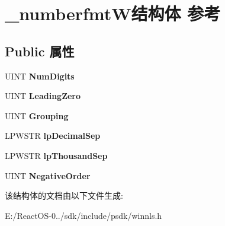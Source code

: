 \hypertarget{struct__numberfmt_w}{}\section{\+\_\+numberfmt\+W结构体 参考}
\label{struct__numberfmt_w}
\subsection*{Public 属性}
\begin{DoxyCompactItemize}
\item 
\mbox{\label{struct__numberfmt_w_a00b789ffbb2212e7744c34581b941bef}} 
U\+I\+NT {\bfseries Num\+Digits}
\item 
\mbox{\label{struct__numberfmt_w_ad8f19dfe23390a056937a276217ae531}} 
U\+I\+NT {\bfseries Leading\+Zero}
\item 
\mbox{\label{struct__numberfmt_w_a8587b09cfdaf189fa4945b3b8e16b4b8}} 
U\+I\+NT {\bfseries Grouping}
\item 
\mbox{\label{struct__numberfmt_w_a6168f5055417b04a1b7244d839a2681b}} 
L\+P\+W\+S\+TR {\bfseries lp\+Decimal\+Sep}
\item 
\mbox{\label{struct__numberfmt_w_ab4d233016244290da34924f24b75b70b}} 
L\+P\+W\+S\+TR {\bfseries lp\+Thousand\+Sep}
\item 
\mbox{\label{struct__numberfmt_w_aaab577c4fc4338d05fa318065ff86f4b}} 
U\+I\+NT {\bfseries Negative\+Order}
\end{DoxyCompactItemize}


该结构体的文档由以下文件生成\+:\begin{DoxyCompactItemize}
\item 
E\+:/\+React\+O\+S-\/0../sdk/include/psdk/winnls.\+h\end{DoxyCompactItemize}
